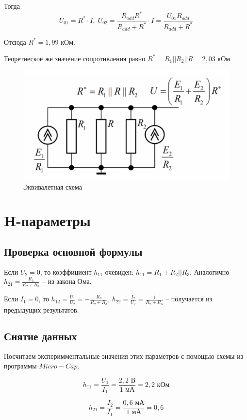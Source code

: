 \documentclass[a4paper, 12pt]{article} %
\begin{document}
Тогда 
$$U_{01} = R^* \cdot I, \; U_{02} = \frac{R_{add}R^*}{R_{add} + R^*} \cdot I = \frac{U_{01}R_{add}}{R_{add} + R^*}$$

Отсюда $R^* = 1,99$ кОм.

Теоретиеское же значение сопротивления равно $R^* = R_1 || R_2 || R = 2,03$ кОм.

\begin{figure}[h!]
    \centering
    \includegraphics[width = 10 cm]{2.png}
    \caption{Эквивалетная схема}
    \label{fig:vac}
\end{figure}

\section{H-параметры}

\subsection{Проверка основной формулы}

Если $U_2 = 0$, то коэффициент $h_{11}$ очевиден: $h_{11} = R_1 + R_2 || R_3$. Аналогично $h_{21} = \frac{R_3}{R_2 + R_3}$ -- из закона Ома.

Если $I_1 = 0$, то $h_{12} = \frac{U_1}{U_2} = - \frac{R_3}{R_2 + R_3}$, $h_{22} = \frac{I_2}{U_2} = \frac{1}{R_2 + R_3}$ -- получается из предыдущих результатов.

\subsection{Снятие данных}

Посчитаем эксперимментальные значения этих параметров с помощью схемы из программы $Micro-Cap$.

$$ h_{11} = \frac{U_1}{I_1} = \frac{2,2 \text{ В}}{1 \text{ мА}} = 2,2 \text{ кОм}$$

$$ h_{21} = \frac{I_2}{I_1} = \frac{0,6 \text{ мА}}{1 \text{ мА}} = 0,6$$
\end{document}

